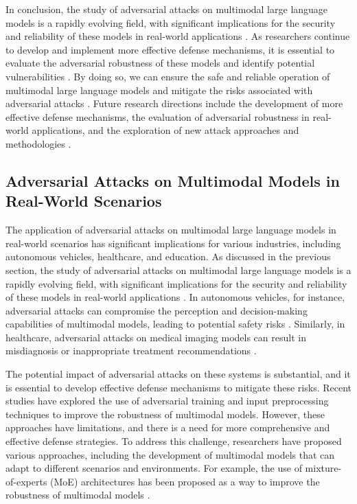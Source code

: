 \documentclass[11pt,a4paper]{article}
\begin{document}
In conclusion, the study of adversarial attacks on multimodal large language models is a rapidly evolving field, with significant implications for the security and reliability of these models in real-world applications \cite{arxiv:2409.18991}. As researchers continue to develop and implement more effective defense mechanisms, it is essential to evaluate the adversarial robustness of these models and identify potential vulnerabilities \cite{arxiv:2408.15769}. By doing so, we can ensure the safe and reliable operation of multimodal large language models and mitigate the risks associated with adversarial attacks \cite{arxiv:2511.20494}. Future research directions include the development of more effective defense mechanisms, the evaluation of adversarial robustness in real-world applications, and the exploration of new attack approaches and methodologies \cite{arxiv:2601.10313}.


\subsection{Adversarial Attacks on Multimodal Models in Real-World Scenarios}


The application of adversarial attacks on multimodal large language models in real-world scenarios has significant implications for various industries, including autonomous vehicles, healthcare, and education. As discussed in the previous section, the study of adversarial attacks on multimodal large language models is a rapidly evolving field, with significant implications for the security and reliability of these models in real-world applications \cite{arxiv:2409.18991}. In autonomous vehicles, for instance, adversarial attacks can compromise the perception and decision-making capabilities of multimodal models, leading to potential safety risks \cite{doi:10.1109/wacvw60836.2024.00106}. Similarly, in healthcare, adversarial attacks on medical imaging models can result in misdiagnosis or inappropriate treatment recommendations \cite{doi:10.1609/aaai.v39i4.32396}.

The potential impact of adversarial attacks on these systems is substantial, and it is essential to develop effective defense mechanisms to mitigate these risks. Recent studies have explored the use of adversarial training and input preprocessing techniques to improve the robustness of multimodal models. However, these approaches have limitations, and there is a need for more comprehensive and effective defense strategies. To address this challenge, researchers have proposed various approaches, including the development of multimodal models that can adapt to different scenarios and environments. For example, the use of mixture-of-experts (MoE) architectures has been proposed as a way to improve the robustness of multimodal models \cite{arxiv:2407.12709}.
\end{document}
